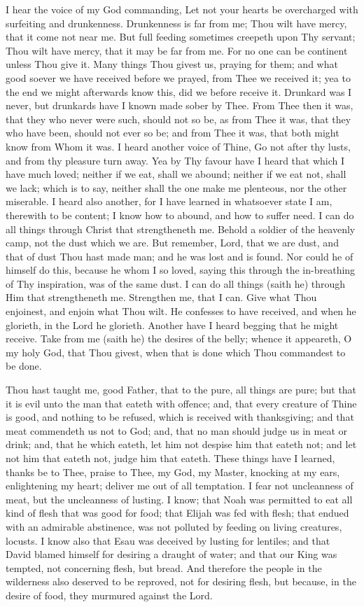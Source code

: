 \documentclass[b5paper,openright,12pt,twoside]{book}
\begin{document}
I hear the voice of my God commanding, Let not your hearts be
overcharged with surfeiting and drunkenness. Drunkenness is far from
me; Thou wilt have mercy, that it come not near me. But full feeding
sometimes creepeth upon Thy servant; Thou wilt have mercy, that it may
be far from me. For no one can be continent unless Thou give it. Many
things Thou givest us, praying for them; and what good soever we have
received before we prayed, from Thee we received it; yea to the end we
might afterwards know this, did we before receive it. Drunkard was I
never, but drunkards have I known made sober by Thee. From Thee then it
was, that they who never were such, should not so be, as from Thee it
was, that they who have been, should not ever so be; and from Thee it
was, that both might know from Whom it was. I heard another voice of
Thine, Go not after thy lusts, and from thy pleasure turn away. Yea by
Thy favour have I heard that which I have much loved; neither if we eat,
shall we abound; neither if we eat not, shall we lack; which is to say,
neither shall the one make me plenteous, nor the other miserable.
I heard also another, for I have learned in whatsoever state I am,
therewith to be content; I know how to abound, and how to suffer need. I
can do all things through Christ that strengtheneth me. Behold a soldier
of the heavenly camp, not the dust which we are. But remember, Lord,
that we are dust, and that of dust Thou hast made man; and he was lost
and is found. Nor could he of himself do this, because he whom I so
loved, saying this through the in-breathing of Thy inspiration, was
of the same dust. I can do all things (saith he) through Him that
strengtheneth me. Strengthen me, that I can. Give what Thou enjoinest,
and enjoin what Thou wilt. He confesses to have received, and when he
glorieth, in the Lord he glorieth. Another have I heard begging that he
might receive. Take from me (saith he) the desires of the belly; whence
it appeareth, O my holy God, that Thou givest, when that is done which
Thou commandest to be done.

Thou hast taught me, good Father, that to the pure, all things are pure;
but that it is evil unto the man that eateth with offence; and, that
every creature of Thine is good, and nothing to be refused, which is
received with thanksgiving; and that meat commendeth us not to God; and,
that no man should judge us in meat or drink; and, that he which eateth,
let him not despise him that eateth not; and let not him that eateth
not, judge him that eateth. These things have I learned, thanks be
to Thee, praise to Thee, my God, my Master, knocking at my ears,
enlightening my heart; deliver me out of all temptation. I fear not
uncleanness of meat, but the uncleanness of lusting. I know; that Noah
was permitted to eat all kind of flesh that was good for food; that
Elijah was fed with flesh; that endued with an admirable abstinence, was
not polluted by feeding on living creatures, locusts. I know also that
Esau was deceived by lusting for lentiles; and that David blamed himself
for desiring a draught of water; and that our King was tempted, not
concerning flesh, but bread. And therefore the people in the wilderness
also deserved to be reproved, not for desiring flesh, but because, in
the desire of food, they murmured against the Lord.
\end{document}
